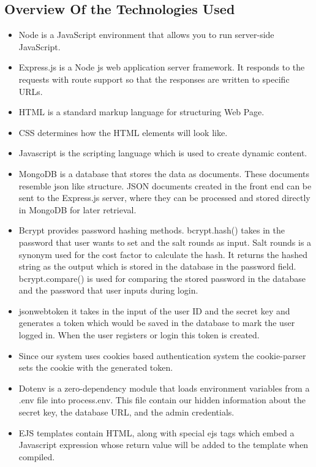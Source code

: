 \documentclass[conference]{IEEEtran}
\begin{document}
\subsection{Overview Of the Technologies Used}
\begin{itemize}
    \item Node is a JavaScript environment that allows you to run server-side JavaScript.
    \item Express.js is a Node js web application server framework. It responds to the requests with route support so that the responses are written to specific URLs.
    \item HTML is a standard markup language for structuring Web Page.
    \item CSS determines how the HTML elements will look like.
    \item Javascript is the scripting language which is used to create dynamic content. 
    \item MongoDB is a database that stores the data as documents. These documents resemble json like structure. JSON documents created in the front end can be sent to the Express.js server, where they can be processed and  stored directly in MongoDB for later retrieval.
    \item Bcrypt provides password hashing methods. bcrypt.hash() takes in the password that user wants to set and the salt rounds as input. Salt rounds is a synonym used for the cost factor to calculate the hash. It returns the hashed string as the output which is stored in the database in the password field. bcrypt.compare() is used for comparing the stored password in the database and the password that user inputs during login.
    \item jsonwebtoken it takes in the input of the user ID and the secret key and generates a token which would be saved in the database to mark the user logged in. When the user registers or login this token is created.
    \item Since our system uses cookies based authentication system the cookie-parser sets the cookie with the generated token.
    \item Dotenv is a zero-dependency module that loads environment variables from a .env file into process.env. This file contain our hidden information about the secret key, the database URL, and the admin credentials.
    \item EJS templates contain HTML, along with special ejs tags which embed a Javascript expression whose return value will be added to the template when compiled. 

\end{itemize}
\end{document}

